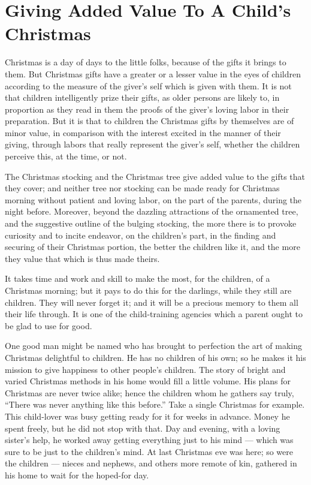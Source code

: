 \documentclass[
]{book}
\begin{document}
\hypertarget{giving-added-value-to-a-childs-christmas}{%
\chapter{Giving Added Value To A Child's Christmas}\label{giving-added-value-to-a-childs-christmas}}

Christmas is a day of days to the little folks, because of the gifts it brings to them. But Christmas gifts have a greater or a lesser value in the eyes of children according to the measure of the giver's self which is given with them. It is not that children intelligently prize their gifts, as older persons are likely to, in proportion as they read in them the proofs of the giver's loving labor in their preparation. But it is that to children the Christmas gifts by themselves are of minor value, in comparison with the interest excited in the manner of their giving, through labors that really represent the giver's self, whether the children perceive this, at the time, or not.

The Christmas stocking and the Christmas tree give added value to the gifts that they cover; and neither tree nor stocking can be made ready for Christmas morning without patient and loving labor, on the part of the parents, during the night before. Moreover, beyond the dazzling attractions of the ornamented tree, and the suggestive outline of the bulging stocking, the more there is to provoke curiosity and to incite endeavor, on the children's part, in the finding and securing of their Christmas portion, the better the children like it, and the more they value that which is thus made theirs.

It takes time and work and skill to make the most, for the children, of a Christmas morning; but it pays to do this for the darlings, while they still are children. They will never forget it; and it will be a precious memory to them all their life through. It is one of the child-training agencies which a parent ought to be glad to use for good.

One good man might be named who has brought to perfection the art of making Christmas delightful to children. He has no children of his own; so he makes it his mission to give happiness to other people's children. The story of bright and varied Christmas methods in his home would fill a little volume. His plans for Christmas are never twice alike; hence the children whom he gathers say truly, ``There was never anything like this before.'' Take a single Christmas for example. This child-lover was busy getting ready for it for weeks in advance. Money he spent freely, but he did not stop with that. Day and evening, with a loving sister's help, he worked away getting everything just to his mind --- which was sure to be just to the children's mind. At last Christmas eve was here; so were the children --- nieces and nephews, and others more remote of kin, gathered in his home to wait for the hoped-for day.
\end{document}

